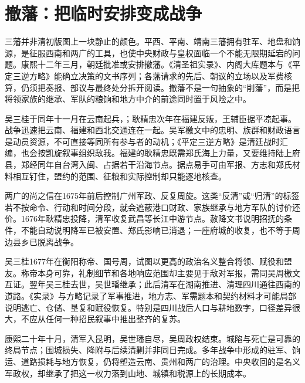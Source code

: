 \section{撤藩：把临时安排变成战争}

三藩并非清初版图上一块静止的颜色。平西、平南、靖南三藩拥有驻军、地盘和饷源，是征服西南和两广的工具，也使中央财政与皇权面临一个不能无限期延宕的问题。康熙十二年三月，朝廷批准或安排撤藩。《清圣祖实录》、内阁大库题本与《平定三逆方略》能确立决策的文书序列；各藩请求的先后、朝议的立场以及军费核算，仍须把奏报、部议与最终处分拆开阅读。撤藩不是一句抽象的“削藩”，而是把将领家族的继承、军队的粮饷和地方中介的前途同时置于风险之中。

吴三桂于同年十一月在云南起兵，；耿精忠次年在福建反叛，王辅臣据平凉起事。战争迅速把云南、福建和西北交通连在一起。吴军檄文中的忠明、族群和财政语言是动员资源，不可直接等同所有参与者的动机；《平定三逆方略》是清廷战时汇编，也会按凯旋叙事组织敌我。福建的耿精忠既需郑氏海上力量，又要维持陆上府县，郑经同年自台湾入闽、占据若干沿海节点。据点易手可由军报、方志和郑氏材料相互钉住，盟约的范围、征粮和实际控制却只能逐地核查。

两广的尚之信在1675年前后控制广州军政、反复周旋。这类“反清”或“归清”的标签若不按命令、行动和时间分段，就会遮蔽港口财政、家族继承与地方军队的讨价还价。1676年耿精忠投降，清军收复武昌等长江中游节点。赦降文书说明招抚的条件，不能自动说明降军已被安置、郑氏影响已消退；一座府城的收复，也不等于周边县乡已脱离战争。

吴三桂1677年在衡阳称帝、国号周，试图以更高的政治名义整合将领、赋役和盟友。称帝本身可靠，礼制细节和各地响应范围却主要见于敌对军报，需同吴周檄文互证。翌年吴三桂去世，吴世璠继承；此后清军在湖南推进、清理四川通往西南的道路。《实录》与方略记录了军事推进，地方志、军需题本和契约材料才可能局部说明逃亡、仓储、垦复和赋役恢复。特别是四川战后人口与耕地数字，口径差异很大，不应从任何一种招民叙事中推出整齐的复苏。

康熙二十年十月，清军入昆明，吴世璠自尽，吴周政权结束。城陷与死亡是可靠的终局节点；围城损失、降附与后续清剿并非同日完成。多年战争中形成的驻军、饷运、道路损耗与地方恢复，仍将塑造云南、贵州和两广的治理。中央收回的是名义军政权，却继承了把这一权力落到山地、城镇和税源上的长期成本。
